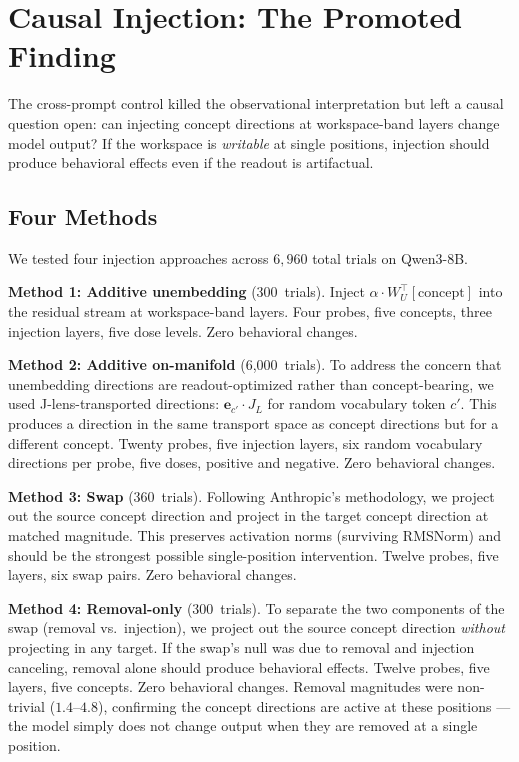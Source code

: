 \documentclass[11pt,a4paper]{article}
\begin{document}
\section{Causal Injection: The Promoted Finding}
\label{sec:causal}

The cross-prompt control killed the observational interpretation but
left a causal question open: can injecting concept directions at
workspace-band layers change model output? If the workspace is
\emph{writable} at single positions, injection should produce
behavioral effects even if the readout is artifactual.

\subsection{Four Methods}

We tested four injection approaches across $6{,}960$ total trials on
Qwen3-8B.

\textbf{Method 1: Additive unembedding} (300~trials). Inject
$\alpha \cdot W_U^\top[\text{concept}]$ into the residual stream at
workspace-band layers. Four probes, five concepts, three injection
layers, five dose levels. Zero behavioral changes.

\textbf{Method 2: Additive on-manifold} (6{,}000~trials). To address
the concern that unembedding directions are readout-optimized rather
than concept-bearing, we used J-lens-transported directions:
$\mathbf{e}_{c'} \cdot J_L$ for random vocabulary token $c'$. This
produces a direction in the same transport space as concept directions
but for a different concept. Twenty probes, five injection layers,
six random vocabulary directions per probe, five doses, positive and
negative. Zero behavioral changes.

\textbf{Method 3: Swap} (360~trials). Following Anthropic's
methodology, we project out the source concept direction and project in
the target concept direction at matched magnitude. This preserves
activation norms (surviving RMSNorm) and should be the strongest
possible single-position intervention. Twelve probes, five layers, six
swap pairs. Zero behavioral changes.

\textbf{Method 4: Removal-only} (300~trials). To separate the two
components of the swap (removal vs.\ injection), we project out the
source concept direction \emph{without} projecting in any target.
If the swap's null was due to removal and injection canceling, removal
alone should produce behavioral effects. Twelve probes, five layers,
five concepts. Zero behavioral changes. Removal magnitudes were
non-trivial ($1.4$--$4.8$), confirming the concept directions are
active at these positions --- the model simply does not change output
when they are removed at a single position.
\end{document}
